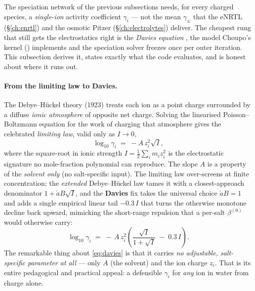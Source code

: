 \documentclass[11pt,a4paper]{article}
\begin{document}
The speciation network of the previous subsections needs, for every
charged species, a \emph{single-ion} activity coefficient $\gamma_i$ ---
not the mean $\gamma_\pm$ that the eNRTL (\S\ref{ch:enrtl}) and the
osmotic Pitzer (\S\ref{ch:electrolytes}) deliver.  The cheapest rung that
still gets the electrostatics right is the \emph{Davies equation}
\cite{Davies1962}, the model Choupo's  kernel
() implements and the speciation solver freezes
once per outer iteration.  This subsection derives it, states exactly
what the code evaluates, and is honest about where it runs out.

\paragraph{From the limiting law to Davies.}  The Debye--H\"uckel theory
(1923) treats each ion as a point charge surrounded by a diffuse
\emph{ionic atmosphere} of opposite net charge.  Solving the linearised
Poisson--Boltzmann equation for the work of charging that atmosphere
gives the celebrated \emph{limiting law}, valid only as $I\to 0$,
\begin{equation}
   \log_{10}\gamma_i \;=\; -A\,z_i^{2}\sqrt I ,
   \label{eq:dh-limiting}
\end{equation}
where the square-root in ionic strength $I=\tfrac12\sum_i m_i z_i^2$ is
the electrostatic signature no mole-fraction polynomial can reproduce.
The slope $A$ is a property of the \emph{solvent only} (no salt-specific
input).  The limiting law over-screens at finite concentration; the
\emph{extended} Debye--H\"uckel law tames it with a closest-approach
denominator $1+\mathring{a}B\sqrt I$, and the \textbf{Davies} fix takes
the universal choice $\mathring{a}B=1$ and adds a single empirical
linear tail $-0.3\,I$ that turns the otherwise monotone decline back
upward, mimicking the short-range repulsion that a per-salt
$\beta^{(0)}$ would otherwise carry:
\begin{equation}
   \boxed{\;
   \log_{10}\gamma_i \;=\; -\,A\,z_i^{2}
   \left(\frac{\sqrt I}{1+\sqrt I} \;-\; 0.3\,I\right).
   \;}
   \label{eq:davies}
\end{equation}
The remarkable thing about \eqref{eq:davies} is that it carries
\emph{no adjustable, salt-specific parameter at all} --- only $A$ (the
solvent) and the ion charge $z_i$.  That is its entire pedagogical and
practical appeal: a defensible $\gamma_i$ for \emph{any} ion in water
from charge alone.
\end{document}
